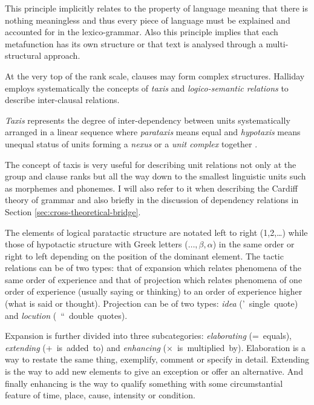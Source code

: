     This principle implicitly relates to the property of language meaning that 
    there is nothing meaningless and thus every piece of language must be explained and accounted for in the lexico-grammar. Also this principle implies that each metafunction has its own structure or that text is analysed through a multi-structural approach.

    At the very top of the rank scale, clauses may form complex structures. Halliday employs systematically the concepts of \textit{taxis} and \textit{logico-semantic relations} to describe inter-clausal relations. 
    
    \begin{definition}[Taxis]\label{def:taxis}
        \textit{Taxis} represents the degree of inter-dependency between units systematically arranged in a linear sequence where \textit{parataxis} means equal and \textit{hypotaxis} means unequal status of units forming a \textit{nexus} or a \textit{unit complex} together \citep[440]{ifg4}.
    \end{definition}

    The concept of taxis is very useful for describing unit relations not only at the group and clause ranks but all the way down to the smallest linguistic units such as morphemes and phonemes. I will also refer to it when describing the Cardiff theory of grammar and also briefly in the discussion of dependency relations in Section \ref{sec:cross-theoretical-bridge}.
    
    The elements of logical paratactic structure are notated left to right (1,2,\dots) while those of hypotactic structure with Greek letters ($\dots, \beta, \alpha$) in the same order or right to left depending on the position of the dominant element. The tactic relations can be of two types: that of expansion which relates phenomena of the same order of experience and that of projection which relates phenomena of one order of experience (usually saying or thinking) to an order of experience higher (what is said or thought). Projection can be of two types: \textit{idea} \mbox{(' single quote)} and \textit{locution} \mbox{( `` double quotes)}.
    
    Expansion is further divided into three subcategories: \textit{elaborating} \mbox{(= equals)}, \textit{extending} \mbox{(+ is added to)} and \textit{enhancing} \mbox{($\times$ is multiplied by)}. Elaboration is a way to restate the same thing, exemplify, comment or specify in detail. Extending is the way to add new elements to give an exception or offer an alternative. And finally enhancing is the way to qualify something with some circumstantial feature of time, place, cause, intensity or condition. 
    
